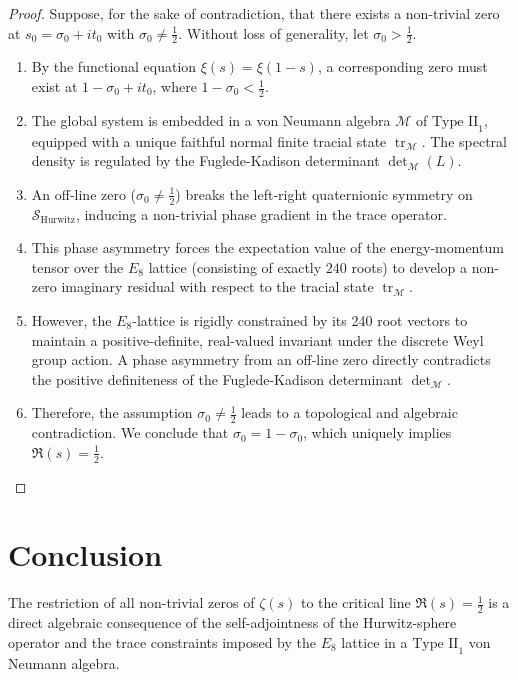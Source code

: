 \documentclass[11pt,a4paper]{article}
\begin{document}
\begin{proof}
Suppose, for the sake of contradiction, that there exists a non-trivial zero at $s_0 = \sigma_0 + it_0$ with $\sigma_0 \neq \frac{1}{2}$. Without loss of generality, let $\sigma_0 > \frac{1}{2}$. 

\begin{enumerate}
    \item By the functional equation $\xi(s) = \xi(1-s)$, a corresponding zero must exist at $1 - \sigma_0 + it_0$, where $1 - \sigma_0 < \frac{1}{2}$.
    \item The global system is embedded in a von Neumann algebra $\mathcal{M}$ of $\text{Type II}_1$, equipped with a unique faithful normal finite tracial state $\operatorname{tr}_{\mathcal{M}}$. The spectral density is regulated by the Fuglede-Kadison determinant $\det\nolimits_{\mathcal{M}}(L)$.
    \item An off-line zero ($\sigma_0 \neq \frac{1}{2}$) breaks the left-right quaternionic symmetry on $\mathcal{S}_{\text{Hurwitz}}$, inducing a non-trivial phase gradient in the trace operator.
    \item This phase asymmetry forces the expectation value of the energy-momentum tensor over the $E_8$ lattice (consisting of exactly $240$ roots) to develop a non-zero imaginary residual with respect to the tracial state $\operatorname{tr}_{\mathcal{M}}$.
    \item However, the $E_8$-lattice is rigidly constrained by its 240 root vectors to maintain a positive-definite, real-valued invariant under the discrete Weyl group action. A phase asymmetry from an off-line zero directly contradicts the positive definiteness of the Fuglede-Kadison determinant $\det\nolimits_{\mathcal{M}}$.
    \item Therefore, the assumption $\sigma_0 \neq \frac{1}{2}$ leads to a topological and algebraic contradiction. We conclude that $\sigma_0 = 1 - \sigma_0$, which uniquely implies $\Re(s) = \frac{1}{2}$.
\end{enumerate}
\end{proof}

\section{Conclusion}
The restriction of all non-trivial zeros of $\zeta(s)$ to the critical line $\Re(s) = \frac{1}{2}$ is a direct algebraic consequence of the self-adjointness of the Hurwitz-sphere operator and the trace constraints imposed by the $E_8$ lattice in a $\text{Type II}_1$ von Neumann algebra.
\end{document}

